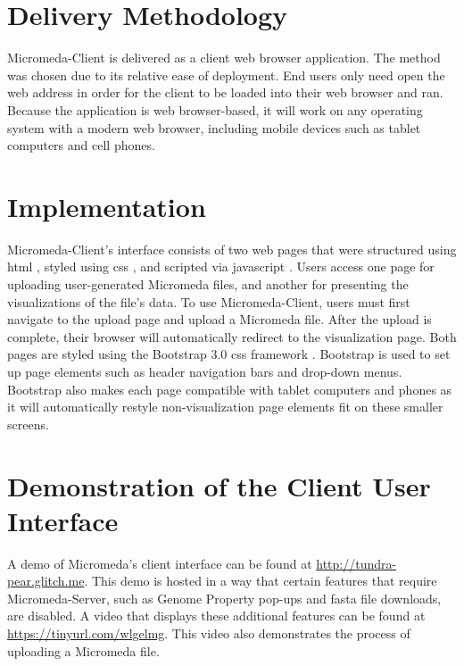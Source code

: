 \section{Delivery Methodology} \label{client-delivery-method}

Micromeda-Client is delivered as a client web browser application. The method 
was chosen due to its relative ease of deployment. End users only need open the 
web address in order for the client to be loaded into their web browser and ran. 
Because the application is web browser-based, it will work on any operating 
system with a modern web browser, including mobile devices such as tablet 
computers and cell phones.

\section{Implementation} \label{client-implementation}

Micromeda-Client's interface consists of two web pages that were structured 
using \gls{html} \cite{HTML5}, styled using \gls{css} \cite{CSS3}, and scripted 
via \gls{javascript} \cite{flanagan2006javascript}. Users access one page for 
uploading user-generated Micromeda files, and another for presenting the 
visualizations of the file's data. To use Micromeda-Client, users must first 
navigate to the upload page and upload a Micromeda file. After the upload is 
complete, their browser will automatically redirect to the visualization page. 
Both pages are styled using the Bootstrap 3.0 \gls{css} framework 
\cite{spurlock2013bootstrap}. Bootstrap is used to set up page elements such as 
header navigation bars and drop-down menus. Bootstrap also makes each page 
compatible with tablet computers and phones as it will automatically restyle 
non-visualization page elements fit on these smaller screens.

\section{Demonstration of the Client User Interface} \label{client-demo}

A demo of Micromeda’s client interface can be found at
\href{http://tundra-pear.glitch.me}{http://tundra-pear.glitch.me}. This demo is 
hosted in a way that certain features that require Micromeda-Server, such as 
Genome Property pop-ups and \gls{fasta} file downloads, are disabled. A video 
that displays these additional features can be found at
\href{https://tinyurl.com/wlgelmg}{https://tinyurl.com/wlgelmg}. 
This video also demonstrates the process of uploading a Micromeda file.

